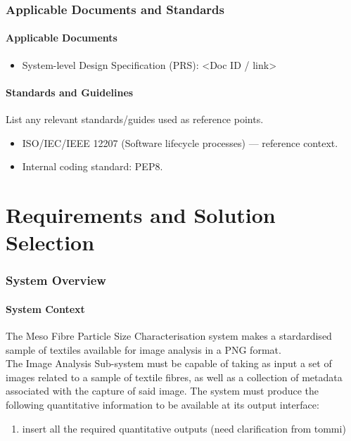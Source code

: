 \documentclass[11pt,a4paper]{article}
\begin{document}
\section{Applicable Documents and Standards}

\subsection{Applicable Documents}
\begin{itemize}
  \item System-level Design Specification (PRS): <Doc ID / link>
\end{itemize}

\subsection{Standards and Guidelines}
List any relevant standards/guides used as reference points.
\begin{itemize}
  \item ISO/IEC/IEEE 12207 (Software lifecycle processes) — reference context.
  \item Internal coding standard: PEP8.
\end{itemize}




\part{Requirements and Solution Selection}

\section{System Overview}

\subsection{System Context}
The Meso Fibre Particle Size Characterisation system makes a stardardised sample of textiles available for image analysis in a PNG format.\\
The Image Analysis Sub-system must be capable of taking as input a set of images related to a sample of textile fibres, as well as a collection of metadata associated with the capture of said image. The system must produce the following quantitative information to be available at its output interface:
\begin{enumerate}
    \item insert all the required quantitative outputs (need clarification from tommi)
\end{enumerate}
\end{document}
